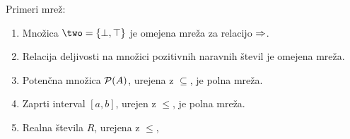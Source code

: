 \begin{zgled}
  Primeri mrež:
  \begin{enumerate}
  \item Množica $\two = \set{\bot, \top}$ je omejena mreža za relacijo $\Rightarrow$.
  \item Relacija deljivosti na množici pozitivnih naravnih števil je omejena mreža.
  \item Potenčna množica $\mathcal{P}(A)$, urejena z $\subseteq$, je polna mreža.
  \item Zaprti interval $[a,b]$, urejen z $\leq$, je polna mreža.
  \item Realna števila $R$, urejena z $\leq$,
  \end{enumerate}
\end{zgled}
